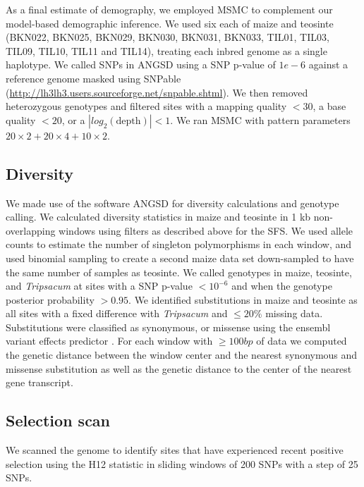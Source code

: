 \documentclass[12pt,a4paper]{article}
\begin{document}
As a final estimate of demography, we employed MSMC \cite{schiffels2014}  to complement our model-based demographic inference. 
We used six each of maize and teosinte (BKN022, BKN025, BKN029, BKN030, BKN031, BKN033, TIL01, TIL03, TIL09, TIL10, TIL11 and TIL14), treating each inbred genome as a single haplotype.
We called SNPs in ANGSD \cite{korneliussen2014} using a SNP p-value of $1e-6$ against a reference genome masked using SNPable (\url{http://lh3lh3.users.sourceforge.net/snpable.shtml}). 
We then removed heterozygous genotypes and filtered sites with a mapping quality $<30$, a base quality $<20$, or a $|\textit{log}_2(\text{depth})|<1$.
We ran MSMC with pattern parameters $20\times2+20\times4+10\times2$.

\subsection*{Diversity}
We made use of the software ANGSD \cite{korneliussen2014} for diversity calculations and genotype calling. 
We calculated diversity statistics in maize and teosinte in 1 kb non-overlapping windows using filters as described above for the SFS. 
We used allele counts to estimate the number of singleton polymorphisms in each window, and used binomial sampling to create a second maize data set down-sampled to have the same number of samples as teosinte.
We called genotypes in maize, teosinte, and \textit{ Tripsacum} at sites with a SNP p-value $<10^{-6}$ and when the genotype posterior probability $>0.95$. 
We identified substitutions in maize and teosinte as all sites with a fixed difference with \textit{Tripsacum} and $\leq 20\%$ missing data. 
Substitutions were classified as synonymous, or missense using the ensembl variant effects predictor \cite{mclaren2010}.
For each window with $\geq 100bp$ of data we computed the genetic distance between the window center and the nearest synonymous and missense substitution as well as the genetic distance to the center of the nearest gene transcript.  

\subsection*{Selection scan}
We scanned the genome to identify sites that have experienced recent positive selection using the H12 statistic \cite{garud2015} in sliding windows of 200 SNPs with a step of 25 SNPs.


{\scriptsize \sf
\renewcommand{\baselinestretch}{2.0}

%

}



\onecolumn

\end{document}
